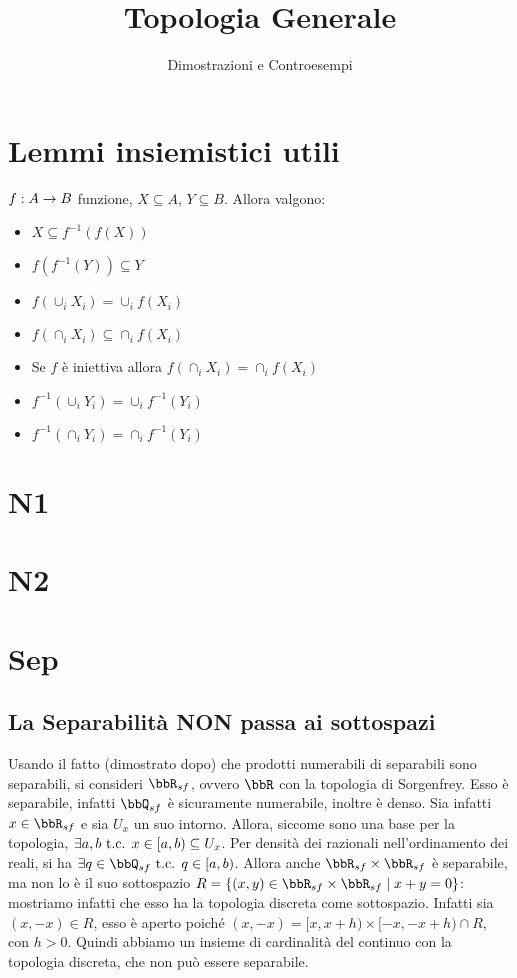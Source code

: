 \documentclass[a4paper,11pt,NoNotes,GeneralMath]{stdmdoc}
\begin{document}
	\title{Topologia Generale}
	\author{Dimostrazioni e Controesempi}
	

	
	\section*{Lemmi insiemistici utili}
	$f: A \rightarrow B$ funzione, $X \subseteq A$, $Y \subseteq B$. Allora valgono:
	\begin{itemize}
		\item $X \subseteq f^{-1}(f(X))$
		\item $f(f^{-1}(Y)) \subseteq Y$
		\item $f(\cup_i X_i) = \cup_i f(X_i)$
		\item $f(\cap_i X_i) \subseteq \cap_i f(X_i)$
		\item Se $f$ è iniettiva allora $f(\cap_i X_i) = \cap_i f(X_i)$
		\item $f^{-1}(\cup_i Y_i) = \cup_i f^{-1}(Y_i)$
		\item $f^{-1}(\cap_i Y_i) = \cap_i f^{-1}(Y_i)$
	\end{itemize}

	\section*{N1}
	\section*{N2}
	\section*{Sep}
	\subsection*{La Separabilità NON passa ai sottospazi}
	Usando il fatto (dimostrato dopo) che prodotti numerabili di separabili sono separabili, si consideri $\bbR_{sf}$, ovvero $\bbR$ con la topologia di Sorgenfrey. Esso è separabile, infatti $\bbQ_{sf}$ è sicuramente numerabile, inoltre è denso. Sia infatti $x \in \bbR_{sf}$ e sia $U_x$ un suo intorno. Allora, siccome sono una base per la topologia, $\exists a, b \mbox{ t.c. } x \in [a, b) \subseteq U_x$. Per densità dei razionali nell'ordinamento dei reali, si ha $\exists q \in \bbQ_{sf} \tc q \in [a, b)$. Allora anche $\bbR_{sf} \times \bbR_{sf}$ è separabile, ma non lo è il suo sottospazio $R = \{ (x, y) \in \bbR_{sf} \times \bbR_{sf} \mid x + y = 0 \}$: mostriamo infatti che esso ha la topologia discreta come sottospazio. Infatti sia $(x, -x) \in R$, esso è aperto poiché $(x, -x) = [x, x+h) \times [-x, -x+h) \cap R$, con $h > 0$. Quindi abbiamo un insieme di cardinalità del continuo con la topologia discreta, che non può essere separabile.
\end{document}
